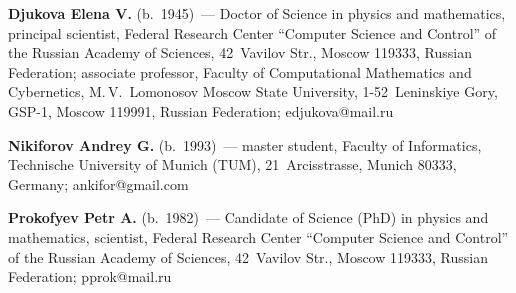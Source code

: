 
\Contr

\noindent
\textbf{Djukova Elena V.} (b.\ 1945)~--- 
Doctor of Science in physics and mathematics, principal scientist, 
Federal Research Center ``Computer Science and Control'' 
of the Russian Academy of Sciences, 42~Vavilov Str., 
Moscow 119333, Russian Federation; 
associate professor, Faculty of Computational Mathematics and Cybernetics,
 M.\,V.~Lomonosov Moscow State University, 1-52~Leninskiye Gory, GSP-1, 
 Moscow 119991, Russian Federation; \mbox{edjukova@mail.ru}

 
\vspace*{3pt}


\noindent
\textbf{Nikiforov Andrey G.} (b.\ 1993)~--- 
master student, Faculty of Informatics, Technische University of Munich (TUM), 
21~Arcisstrasse,  Munich 80333, Germany; \mbox{ankifor@gmail.com}

\vspace*{3pt}


\noindent
\textbf{Prokofyev Petr A.} (b.\ 1982)~--- 
Candidate of Science (PhD) in physics and mathematics, scientist, 
Federal Research Center ``Computer Science and Control'' 
of the Russian Academy of Sciences, 42~Vavilov Str., Moscow 119333, 
Russian Federation; \mbox{pprok@mail.ru}





\newpage

\vspace*{-28pt}


\def\tit{О РАСПАРАЛЛЕЛИВАНИИ АСИМПТОТИЧЕСКИ ОПТИМАЛЬНЫХ АЛГОРИТМОВ ДУАЛИЗАЦИИ$^*$}




\def\titkol{О распараллеливании асимптотически оптимальных алгоритмов дуализации}

\def\aut{Е.\,В. Дюкова$^{1,2}$,
А.\,Г.~Никифоров$^3$,
П.\,А.~Прокофьев$^1$}

\def\autkol{Е.\,В. Дюкова, А.\,Г.~Никифоров, П.\,А.~Прокофьев}


{\renewcommand{\thefootnote}{\fnsymbol{footnote}}
}


